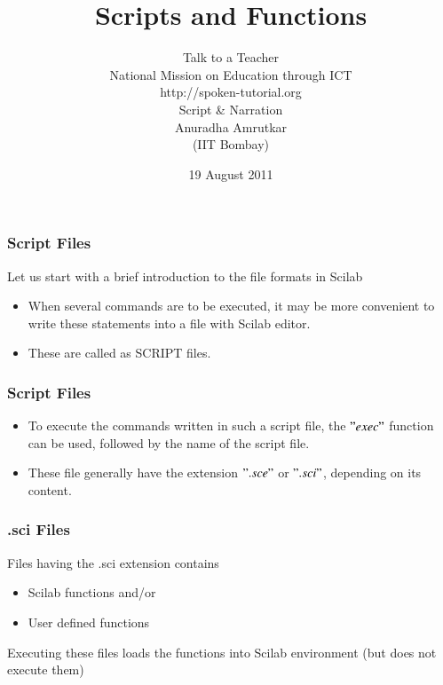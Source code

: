 \documentclass[17pt]{beamer}
\begin{document}
\sffamily 
\bfseries
\title
[ Scripts and Functions
\hspace{0.5cm}
\insertframenumber/\inserttotalframenumber]
{\normalsize Scripts and Functions}
\vspace{-1 cm}
\author[ Script \& Narration-Anuradha Amrutkar]{{ \small Talk to a Teacher \\ National Mission on Education through ICT \\ http://spoken-tutorial.org }\\{\scriptsize Script \& Narration} \vspace{-0.2cm}\\  {\small Anuradha Amrutkar}\vspace{-0.3cm} \\{\scriptsize (IIT Bombay)}\vspace{-1 cm}}

\date{ \scriptsize 19 August 2011}

\begin{frame}
\maketitle
\end{frame}

\begin{frame}[fragile]
\frametitle{Script Files}
Let us start with a brief introduction to the file formats in Scilab\pause
\begin{itemize}
\item<+-|alert@+>  When several commands are to be executed, it may be more convenient to write these statements into a file with Scilab editor.
\item<+-|alert@+> These are called as SCRIPT files.
\end{itemize}
\end{frame}

\begin{frame}[fragile]
\frametitle{Script Files}
\begin{itemize}
\item<+-|alert@+>  To execute the commands written in such a script file, the $"exec"$ function can be used, followed by the name of the script file.
\item<+-|alert@+>  These file generally have the extension $".sce"$ or $".sci"$, depending on its content.
\end{itemize}
\end{frame}

\begin{frame}[fragile]
\frametitle{.sci Files}
Files having the .sci extension contains\pause
\begin{itemize}
\item Scilab functions and/or
\item User defined functions
\end{itemize}\pause

\vspace{0.5cm}
Executing these files loads the functions into Scilab environment (but does not execute them)
\end{frame}
\end{document}
